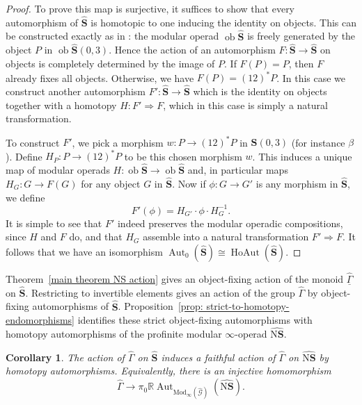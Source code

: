 \documentclass{amsart}
\newcommand{\bS}{\mathbf{S}}
\newcommand{\Grpd}{\mathscr{G}}
\newcommand{\Mod}{\mathrm{Mod}}
\newcommand{\nerve}{\mathrm{N}}
\newcommand{\ob}{\operatorname{ob}}
\newcommand{\Aut}{\operatorname{Aut}}
\newcommand{\HoAut}{\operatorname{HoAut}}
\newcommand{\NS}{\widehat{\mathsf{\Gamma}}}
\newtheorem{cor}[theorem]{Corollary}%
\theoremstyle{definition}
\numberwithin{equation}{section}
\begin{document}
\begin{proof}
To prove this map is surjective, it suffices to show that every automorphism of $\widehat{\bS}$ is homotopic to one inducing the identity on objects. This can be constructed exactly as in \cite[Theorem 7.8]{Horel_profinite_groupoids}:  the modular operad $\ob \widehat{\bS}$ is freely generated by the object $P$ in $\ob \widehat{\bS}(0,3)$. Hence the action of an automorphism $F:\widehat{\bS}\to \widehat{\bS}$ on objects is completely determined by the image of $P$. If $F(P)=P$, then $F$ already fixes all objects. Otherwise, we have $F(P)=(12)^*P$. In this case we construct another automorphism $F':\widehat{\bS}\to \widehat{\bS}$  which is the identity on objects together with a homotopy $H:F'\Rightarrow F$, which in this case is simply a natural transformation.

To construct $F'$, we pick a morphism $w:P\to (12)^*P$ in $\widehat{\bS}(0,3)$ (for instance $\beta$). Define $H_P:P\to (12)^*P$ to be this chosen morphism $w$. This induces a unique map of modular operads $H:\ob\widehat{\bS}\to \ob\widehat{\bS}$ and, in particular maps $H_G:G\to F(G)$ for any object $G$ in $\widehat{\bS}$. Now if $\phi:G\to G'$ is any morphism in $\widehat{\bS}$, we define 
    \[F'(\phi)=H_{G'} \cdot\phi\cdot H_G^{-1}.\]
It is simple to see that $F'$ indeed preserves the modular operadic compositions, since $H$ and $F$ do, and that $H_G$ assemble into a natural transformation $F'\Rightarrow F$.  It follows that we have an isomorphism $\Aut_0(\widehat{\bS})\cong \HoAut(\widehat{\bS})$.

\end{proof}






Theorem~\ref{main theorem NS action} gives an object-fixing action of the monoid $\underline{\NS}$ on $\widehat{\bS}$. Restricting to invertible elements gives an action of the group $\NS$ by object-fixing automorphisms of $\widehat{\bS}$. Proposition~\ref{prop: strict-to-homotopy-endomorphisms} identifies these strict object-fixing automorphisms with homotopy automorphisms of the profinite modular $\infty$-operad $\widehat{\nerve\bS}$.

\begin{cor}\label{cor: homotopy NS action}
The action of $\NS$ on $\widehat{\bS}$ induces a faithful action of $\NS$ on $\widehat{\nerve\bS}$ by homotopy automorphisms. Equivalently, there is an injective homomorphism
\[
\NS
\longrightarrow
\pi_0\mathbb R\Aut_{\Mod_{\infty}(\widehat{\Grpd})}
(\widehat{\nerve\bS}).
\]
\end{cor}
\end{document}
